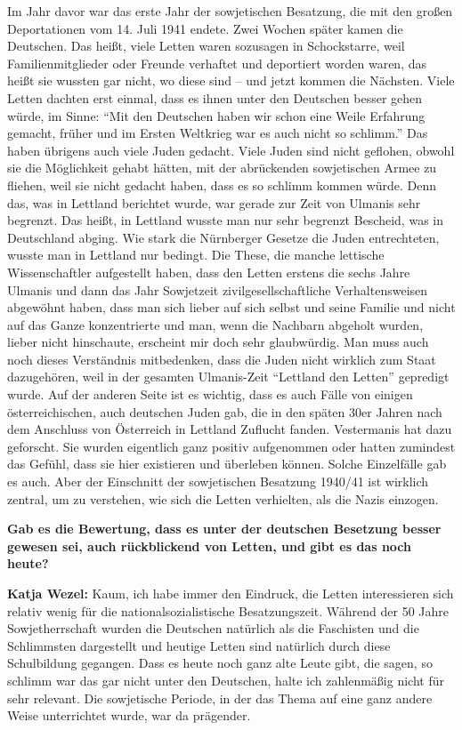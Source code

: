 Im Jahr davor war das erste Jahr der sowjetischen Besatzung, die mit den großen Deportationen vom 14. Juli 1941 endete. Zwei Wochen später kamen die Deutschen. Das heißt, viele Letten waren sozusagen in Schockstarre, weil Familienmitglieder oder Freunde verhaftet und deportiert worden waren, das heißt sie wussten gar nicht, wo diese sind – und jetzt kommen die Nächsten. Viele Letten dachten erst einmal, dass es ihnen unter den Deutschen besser gehen würde, im Sinne: ``Mit den Deutschen haben wir schon eine Weile Erfahrung gemacht, früher und im Ersten Weltkrieg war es auch nicht so schlimm.'' Das haben übrigens auch viele Juden gedacht. Viele Juden sind nicht geflohen, obwohl sie die Möglichkeit gehabt hätten, mit der abrückenden sowjetischen Armee zu fliehen, weil sie nicht gedacht haben, dass es so schlimm kommen würde. Denn das, was in Lettland berichtet wurde, war gerade zur Zeit von Ulmanis sehr begrenzt. Das heißt, in Lettland wusste man nur sehr begrenzt Bescheid, was in Deutschland abging. Wie stark die Nürnberger Gesetze die Juden entrechteten, wusste man in Lettland nur bedingt. Die These, die manche lettische Wissenschaftler aufgestellt haben, dass den Letten erstens die sechs Jahre Ulmanis und dann das Jahr Sowjetzeit zivilgesellschaftliche Verhaltensweisen abgewöhnt haben, dass man sich lieber auf sich selbst und seine Familie und nicht auf das Ganze konzentrierte und man, wenn die Nachbarn abgeholt wurden, lieber nicht hinschaute, erscheint mir doch sehr glaubwürdig. Man muss auch noch dieses Verständnis mitbedenken, dass die Juden nicht wirklich zum Staat dazugehören, weil in der gesamten Ulmanis-Zeit ``Lettland den Letten'' gepredigt wurde. Auf der anderen Seite ist es wichtig, dass es auch Fälle von einigen österreichischen, auch deutschen Juden gab, die in den späten 30er Jahren nach dem Anschluss von Österreich in Lettland Zuflucht fanden. Vestermanis hat dazu geforscht. Sie wurden eigentlich ganz positiv aufgenommen oder hatten zumindest das Gefühl, dass sie hier existieren und überleben können. Solche Einzelfälle gab es auch. Aber der Einschnitt der sowjetischen Besatzung 1940/41 ist wirklich zentral, um zu verstehen, wie sich die Letten verhielten, als die Nazis einzogen. 

\textbf{Gab es die Bewertung, dass es unter der deutschen Besetzung besser gewesen sei, auch rückblickend von Letten, und gibt es das noch heute?} 

\textbf{Katja Wezel:} Kaum, ich habe immer den Eindruck, die Letten interessieren sich relativ wenig für die nationalsozialistische Besatzungszeit. Während der 50 Jahre Sowjetherrschaft wurden die Deutschen natürlich als die Faschisten und die Schlimmsten dargestellt und heutige Letten sind natürlich durch diese Schulbildung gegangen. Dass es heute noch ganz alte Leute gibt, die sagen, so schlimm war das gar nicht unter den Deutschen, halte ich zahlenmäßig nicht für sehr relevant. Die sowjetische Periode, in der das Thema auf eine ganz andere Weise unterrichtet wurde, war da prägender. 

